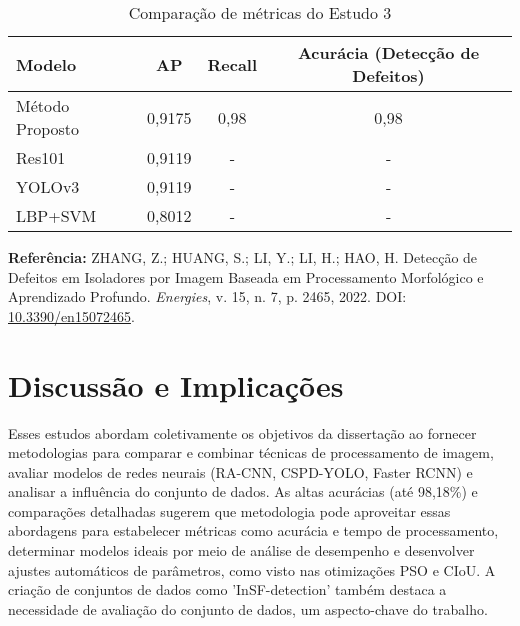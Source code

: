 \begin{table}[h]
    \centering
    \caption{Comparação de métricas do Estudo 3}
    \begin{tabular}{lccc}
        \hline
        \textbf{Modelo} & \textbf{AP} & \textbf{Recall} & \textbf{Acurácia (Detecção de Defeitos)} \\
        \hline
        Método Proposto & 0,9175 & 0,98 & 0,98 \\
        Res101 & 0,9119 & - & - \\
        YOLOv3 & 0,9119 & - & - \\
        LBP+SVM & 0,8012 & - & - \\
        \hline
    \end{tabular}
\end{table}


\textbf{Referência:} ZHANG, Z.; HUANG, S.; LI, Y.; LI, H.; HAO, H. Detecção de Defeitos em Isoladores por Imagem Baseada em Processamento Morfológico e Aprendizado Profundo. \textit{Energies}, v. 15, n. 7, p. 2465, 2022. DOI: \href{https://doi.org/10.3390/en15072465}{10.3390/en15072465}.

\section{Discussão e Implicações}
Esses estudos abordam coletivamente os objetivos da dissertação ao fornecer metodologias para comparar e combinar técnicas de processamento de imagem, avaliar modelos de redes neurais (RA-CNN, CSPD-YOLO, Faster RCNN) e analisar a influência do conjunto de dados. As altas acurácias (até 98,18\%) e comparações detalhadas sugerem que metodologia pode aproveitar essas abordagens para estabelecer métricas como acurácia e tempo de processamento, determinar modelos ideais por meio de análise de desempenho e desenvolver ajustes automáticos de parâmetros, como visto nas otimizações PSO e CIoU. A criação de conjuntos de dados como 'InSF-detection' também destaca a necessidade de avaliação do conjunto de dados, um aspecto-chave do trabalho.



